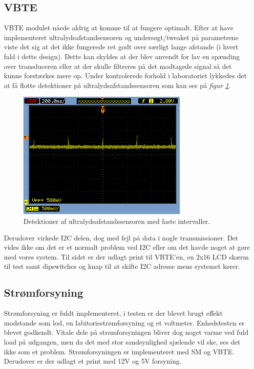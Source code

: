 \subsection{VBTE}
VBTE modulet nåede aldrig at komme til at fungere optimalt. Efter at have implementeret ultralydsafstandsensoren  og undersøgt/tweaket på parametrene viste det sig at det ikke fungerede ret godt over særligt lange afstande (i hvert fald i dette design). Dette kan skyldes at der blev anvendt for lav en spænding over transduceren eller at der skulle filtreres på det modtagede signal så det kunne forstærkes mere op. Under kontrolerede forhold i laboratoriet lykkedes det at få flotte detektioner på ultralydsafstandssensoren som kan ses på \textit{figur \ref{res:ultraresultater}}.
\begin{figure}[H]
\centering
\includegraphics[width = .5\textwidth]{billeder/mixer2}
\caption{Detektioner af ultralydsafstandssensoren med faste intervaller.}
\label{res:ultraresultater}
\end{figure}
Derudover virkede I2C delen, dog med fejl på data i nogle transmissioner. Det vides ikke om det er et normalt problem ved I2C eller om det havde noget at gøre med vores system. Til sidst er der udlagt print til VBTE'en, en 2x16 LCD skærm til test samt dipswitches og knap til at skifte I2C adresse mens systemet kører. 

\subsection{Strømforsyning}
Strømforsyning er fuldt implementeret, i testen er der blevet brugt effekt modstande som lod, en labitoriestrømforsyning og et voltmeter. Enhedstesten er blevet godkendt. Vitale dele på strømforsyningen bliver dog noget varme ved fuld load på udgangen, men da det med stor sandsynlighed sjælende vil ske, ses det ikke som et problem. Strømforsyningen er implementeret med SM og VBTE. Derudover er der udlagt et print med 12V og 5V forsyning.

